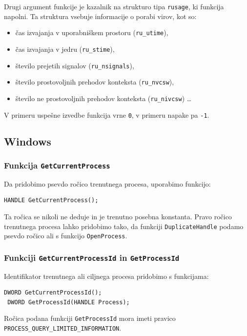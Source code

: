 \documentclass[a4paper,12pt,openright]{book}
\begin{document}
Drugi argument funkcije je kazalnik na strukturo tipa \texttt{rusage}, ki funkcija napolni.
Ta struktura vsebuje informacije o porabi virov, kot so:
\begin{itemize}
	\item čas izvajanja v uporabniškem prostoru (\texttt{ru\_utime}),
	\item čas izvajanja v jedru (\texttt{ru\_stime}),
	\item število prejetih signalov (\texttt{ru\_nsignals}),
	\item število prostovoljnih prehodov konteksta (\texttt{ru\_nvcsw}),
	\item število ne prostovoljnih prehodov konteksta (\texttt{ru\_nivcsw}) \dots
\end{itemize}

V primeru uspešne izvedbe funkcija vrne \texttt{0}, v primeru napake pa \texttt{-1}.

\subsection{Windows}

\subsubsection{Funkcija \texttt{GetCurrentProcess}}

Da pridobimo psevdo ročico trenutnega procesa, uporabimo funkcijo:
\begin{lstlisting}[style=func]
 HANDLE GetCurrentProcess();
\end{lstlisting}

Ta ročica se nikoli ne deduje in je trenutno posebna konstanta.
Pravo ročico trenutnega procesa lahko pridobimo tako, da funkciji \texttt{DuplicateHandle} podamo psevdo ročico ali s funkcijo \texttt{OpenProcess}.

\subsubsection{Funkciji \texttt{GetCurrentProcessId} in \texttt{GetProcessId}}

Identifikator trenutnega ali ciljnega procesa pridobimo s funkcijama:
\begin{lstlisting}[style=func]
 DWORD GetCurrentProcessId();
 DWORD GetProcessId(HANDLE Process);
\end{lstlisting}

Ročica podana funkciji \texttt{GetProcessId} mora imeti pravico \texttt{PROCESS\_QUERY\-\_LIMITED\-\_INFORMATION}.
\end{document}
